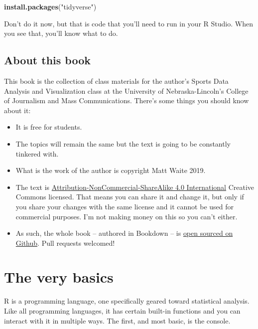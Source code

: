 \documentclass[]{book}
\newenvironment{Shaded}{\begin{snugshade}}{\end{snugshade}}
\newcommand{\KeywordTok}[1]{\textcolor[rgb]{0.13,0.29,0.53}{\textbf{#1}}}
\newcommand{\NormalTok}[1]{#1}
\newcommand{\StringTok}[1]{\textcolor[rgb]{0.31,0.60,0.02}{#1}}
\providecommand{\tightlist}{%
  \setlength{\itemsep}{0pt}\setlength{\parskip}{0pt}}
\begin{document}
\begin{Shaded}
\begin{Highlighting}[]
\KeywordTok{install.packages}\NormalTok{(}\StringTok{"tidyverse"}\NormalTok{)}
\end{Highlighting}
\end{Shaded}

Don't do it now, but that is code that you'll need to run in your R Studio. When you see that, you'll know what to do.

\hypertarget{about-this-book}{%
\section{About this book}\label{about-this-book}}

This book is the collection of class materials for the author's Sports Data Analysis and Visualization class at the University of Nebraska-Lincoln's College of Journalism and Mass Communications. There's some things you should know about it:

\begin{itemize}
\tightlist
\item
  It is free for students.
\item
  The topics will remain the same but the text is going to be constantly tinkered with.
\item
  What is the work of the author is copyright Matt Waite 2019.
\item
  The text is \href{https://creativecommons.org/licenses/by-nc-sa/4.0/}{Attribution-NonCommercial-ShareAlike 4.0 International} Creative Commons licensed. That means you can share it and change it, but only if you share your changes with the same license and it cannot be used for commercial purposes. I'm not making money on this so you can't either.\\
\item
  As such, the whole book -- authored in Bookdown -- is \href{https://github.com/mattwaite/sportsdatabook}{open sourced on Github}. Pull requests welcomed!
\end{itemize}

\hypertarget{the-very-basics}{%
\chapter{The very basics}\label{the-very-basics}}

R is a programming language, one specifically geared toward statistical analysis. Like all programming languages, it has certain built-in functions and you can interact with it in multiple ways. The first, and most basic, is the console.
\end{document}
